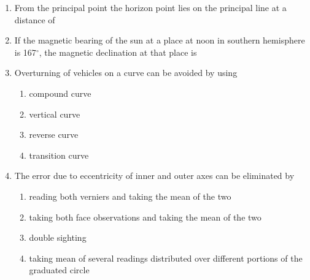 \documentclass[11pt,a4paper]{article}
\begin{document}
\begin{enumerate}
\item{From the principal point the horizon point lies on the principal line at a distance of}
\\
\item{If the magnetic bearing of the sun at a place at noon in southern hemisphere is 167$^\circ$, the magnetic declination at that place is
}
\\
\item{Overturning of vehicles on a curve can be avoided by using}
\begin{enumerate}[label=\Alph*.]
\item{compound curve}
\item{vertical curve}
\item{reverse curve}
\item{transition curve}
\end{enumerate}
\item{The error due to eccentricity of inner and outer axes can be eliminated by}
\begin{enumerate}[label=\Alph*.]
\item{reading both verniers and taking the mean of the two}
\item{taking both face observations and taking the mean of the two}
\item{double sighting}
\item{taking mean of several readings distributed over different portions of the graduated circle}
\end{enumerate}

\end{enumerate}
\end{document}

